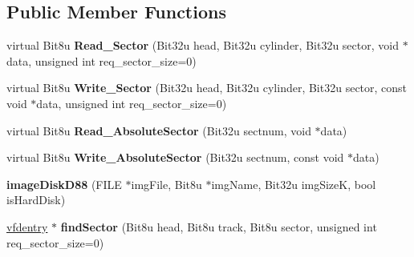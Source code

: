 \subsection*{Public Member Functions}
\begin{DoxyCompactItemize}
\item 
\hypertarget{classimageDiskD88_aa1a95a6d5c642449ac9c1320179cdd09}{virtual Bit8u {\bfseries Read\-\_\-\-Sector} (Bit32u head, Bit32u cylinder, Bit32u sector, void $\ast$data, unsigned int req\-\_\-sector\-\_\-size=0)}\label{classimageDiskD88_aa1a95a6d5c642449ac9c1320179cdd09}

\item 
\hypertarget{classimageDiskD88_af605b0f5a289b0f3d948dba8faa7b3a8}{virtual Bit8u {\bfseries Write\-\_\-\-Sector} (Bit32u head, Bit32u cylinder, Bit32u sector, const void $\ast$data, unsigned int req\-\_\-sector\-\_\-size=0)}\label{classimageDiskD88_af605b0f5a289b0f3d948dba8faa7b3a8}

\item 
\hypertarget{classimageDiskD88_af8230d40be03c62463dd66215c36ea5b}{virtual Bit8u {\bfseries Read\-\_\-\-Absolute\-Sector} (Bit32u sectnum, void $\ast$data)}\label{classimageDiskD88_af8230d40be03c62463dd66215c36ea5b}

\item 
\hypertarget{classimageDiskD88_a4114b99fafdf67358d319debb334783c}{virtual Bit8u {\bfseries Write\-\_\-\-Absolute\-Sector} (Bit32u sectnum, const void $\ast$data)}\label{classimageDiskD88_a4114b99fafdf67358d319debb334783c}

\item 
\hypertarget{classimageDiskD88_a29f144a6d350edb34f8d642f1abefa10}{{\bfseries image\-Disk\-D88} (F\-I\-L\-E $\ast$img\-File, Bit8u $\ast$img\-Name, Bit32u img\-Size\-K, bool is\-Hard\-Disk)}\label{classimageDiskD88_a29f144a6d350edb34f8d642f1abefa10}

\item 
\hypertarget{classimageDiskD88_adc006857303fbac973404270ee15b056}{\hyperlink{structimageDiskD88_1_1vfdentry}{vfdentry} $\ast$ {\bfseries find\-Sector} (Bit8u head, Bit8u track, Bit8u sector, unsigned int req\-\_\-sector\-\_\-size=0)}\label{classimageDiskD88_adc006857303fbac973404270ee15b056}

\end{DoxyCompactItemize}
